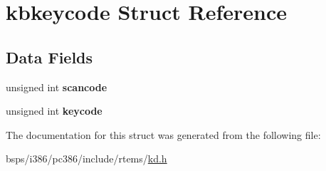 \hypertarget{structkbkeycode}{}\section{kbkeycode Struct Reference}
\label{structkbkeycode}
\subsection*{Data Fields}
\begin{DoxyCompactItemize}
\item 
\mbox{\label{structkbkeycode_af404884681962cfb9876e8d4cc5e09b7}} 
unsigned int {\bfseries scancode}
\item 
\mbox{\label{structkbkeycode_a0e153baeff7bb8e06f318f3cb0492e83}} 
unsigned int {\bfseries keycode}
\end{DoxyCompactItemize}


The documentation for this struct was generated from the following file\+:\begin{DoxyCompactItemize}
\item 
bsps/i386/pc386/include/rtems/\mbox{\hyperlink{kd_8h}{kd.\+h}}\end{DoxyCompactItemize}
